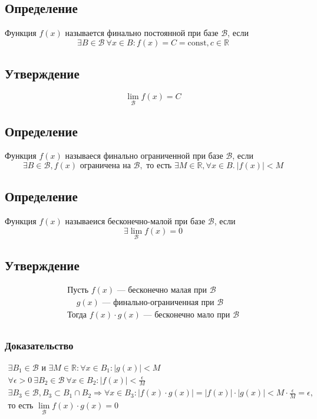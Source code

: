 \documentclass{article}
\begin{document}
\subsection{Определение}
Функция $f(x)$ называется финально постоянной при базе $\mathcal{B}$, если
\[
\exists B \in \mathcal{B}~\forall x \in B: f(x) = C = \text{const}, c \in \mathbb{R}
\]

\subsection{Утверждение}
\[
\lim_{\mathcal{B}} f(x) = C
\]

\subsection{Определение}
Функция $f(x)$ называеся финально ограниченной при базе $\mathcal{B}$, если
\[
\exists B \in \mathcal{B}, f(x) \text{ ограничена на } \mathcal{B}, \text{ то есть } \exists M \in \mathbb{R}, \forall x \in B.~|f(x)| < M
\]

\subsection{Определение}
Функция $f(x)$ называеися бесконечно-малой при базе $\mathcal{B}$, если
\[
\exists \lim_{\mathcal{B}} f(x) = 0
\]

\subsection{Утверждение}
\begin{gather*}
    \text{Пусть } f(x) \text{ --- бесконечно малая при } \mathcal{B} \\
    ~~~~~ g(x) \text{ --- финально-ограниченная при } \mathcal{B} \\
    \text{Тогда } f(x) \cdot g(x) \text{ --- бесконечно мало при } \mathcal{B} \\
\end{gather*}

\subsubsection{Доказательство}
\begin{gather*}
    \exists B_1 \in \mathcal{B} \text{ и } \exists M \in \mathbb{R}: \forall x \in B_1: |g(x)| < M \\
    \forall \epsilon > 0~\exists B_2 \in \mathcal{B}~\forall x \in B_2: |f(x)| < \frac{\epsilon}{M} \\
    \exists B_3 \in \mathcal{B}, B_3 \subset B_1 \cap B_2 \Rightarrow \forall x \in B_3: |f(x) \cdot g(x)| = |f(x)| \cdot |g(x)| < M \cdot \frac{\epsilon}{M} = \epsilon, \\
    \text{то есть } \lim_{\mathcal{B}} f(x) \cdot g(x) = 0
\end{gather*}
\end{document}
